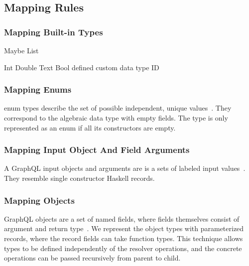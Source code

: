 
\subsection{Mapping Rules}

\begin{frame}\frametitle{Mapping Built-in Types}
\begin{itemize}
  \begin{itemize}
     Maybe
     List
  \end{itemize}
  \begin{itemize}
     Int
     Double
     Text
     Bool
      defined custom data type ID 
  \end{itemize}
\end{itemize}
\end{frame}

\begin{frame}\frametitle{Mapping Enums}

enum types describe the set of possible independent, unique values~\cite{gql-spec}. They correspond to the algebraic data type with empty fields. The type is only represented as an enum if all its constructors are empty.


\end{frame}

\begin{frame}\frametitle{Mapping Input Object And Field Arguments}

A GraphQL input objects and arguments are is a sets of labeled input values~\cite{gql-spec}. They resemble single constructor Haskell records. 


\end{frame}
\begin{frame}[allowframebreaks]\frametitle{Mapping Objects}

GraphQL objects are a set of named fields, where fields themselves consist of argument and return type~\cite{gql-spec}. We represent the object types with parameterized records, where the record fields can take function types. This technique allows types to be defined independently of the resolver operations, and the concrete operations can be passed recursively from parent to child. 



\end{frame}

